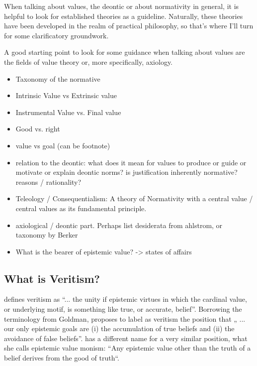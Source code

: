 \documentclass[12pt,numbers=noenddot]{scrartcl}
\begin{document}
When talking about values, the deontic or about normativity in general, it is helpful to look for established theories as a guideline. Naturally, these theories have been developed in the realm of practical philosophy, so that's where I'll turn for some clarificatory groundwork.

A good starting point to look for some guidance when talking about values are the fields of value theory or, more specifically, axiology.

\begin{itemize}
    \item Taxonomy of the normative
    \item Intrinsic Value vs Extrinsic value 
    \item Instrumental Value vs. Final value 
    \item Good vs. right 
    \item value vs goal (can be footnote)
    \item relation to the deontic: what does it mean for values to produce or guide or motivate or explain deontic norms? is justification inherently normative? reasons / rationality?
    \item Teleology / Consequentialism: A theory of Normativity with a central value / central values as its fundamental principle.
    \item axiological / deontic part. Perhaps list desiderata from ahlstrom, or taxonomy by Berker
    \item What is the bearer of epistemic value? -> states of affairs
\end{itemize}

\subsection{What is Veritism?}

\textcite[54]{Goldman2002-GOLTUO-2} defines veritism as  “... the unity if epistemic virtues in which the cardinal value, or underlying motif, is something like true, or accurate, belief”. Borrowing the terminology from Goldman, \textcite[360]{Berker2013-BERETA-2} proposes to label as veritism the position that „ ... our only epistemic goals are (i) the accumulation of true beliefs and (ii) the avoidance of false beliefs”. \textcite{Zagzebski2004-ZAGEVM-2} has a different name for a very similar position, what she calls epistemic value monism: “Any epistemic value other than the truth of a belief derives from the good of truth“. 
\end{document}
